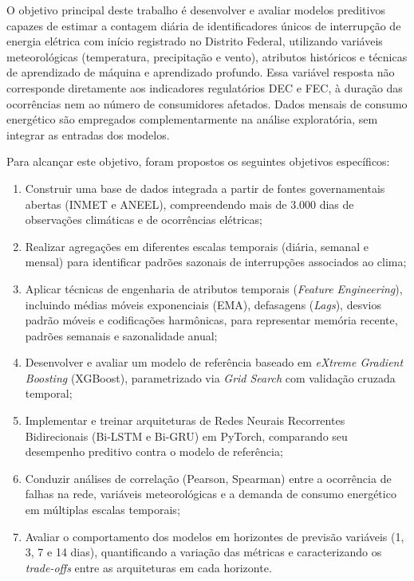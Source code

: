O objetivo principal deste trabalho é desenvolver e avaliar modelos preditivos capazes de estimar a contagem diária de identificadores únicos de interrupção de energia elétrica com início registrado no Distrito Federal, utilizando variáveis meteorológicas (temperatura, precipitação e vento), atributos históricos e técnicas de aprendizado de máquina e aprendizado profundo. Essa variável resposta não corresponde diretamente aos indicadores regulatórios DEC e FEC, à duração das ocorrências nem ao número de consumidores afetados. Dados mensais de consumo energético são empregados complementarmente na análise exploratória, sem integrar as entradas dos modelos.

Para alcançar este objetivo, foram propostos os seguintes objetivos específicos:
\begin{enumerate}
    \item Construir uma base de dados integrada a partir de fontes governamentais abertas (INMET e ANEEL), compreendendo mais de 3.000 dias de observações climáticas e de ocorrências elétricas;
    \item Realizar agregações em diferentes escalas temporais (diária, semanal e mensal) para identificar padrões sazonais de interrupções associados ao clima;
    \item Aplicar técnicas de engenharia de atributos temporais (\textit{Feature Engineering}), incluindo médias móveis exponenciais (EMA), defasagens (\textit{Lags}), desvios padrão móveis e codificações harmônicas, para representar memória recente, padrões semanais e sazonalidade anual;
    \item Desenvolver e avaliar um modelo de referência baseado em \textit{eXtreme Gradient Boosting} (XGBoost), parametrizado via \textit{Grid Search} com validação cruzada temporal;
    \item Implementar e treinar arquiteturas de Redes Neurais Recorrentes Bidirecionais (Bi-LSTM e Bi-GRU) em PyTorch, comparando seu desempenho preditivo contra o modelo de referência;
    \item Conduzir análises de correlação (Pearson, Spearman) entre a ocorrência de falhas na rede, variáveis meteorológicas e a demanda de consumo energético em múltiplas escalas temporais;
    \item Avaliar o comportamento dos modelos em horizontes de previsão variáveis (1, 3, 7 e 14 dias), quantificando a variação das métricas e caracterizando os \textit{trade-offs} entre as arquiteturas em cada horizonte.
\end{enumerate}

